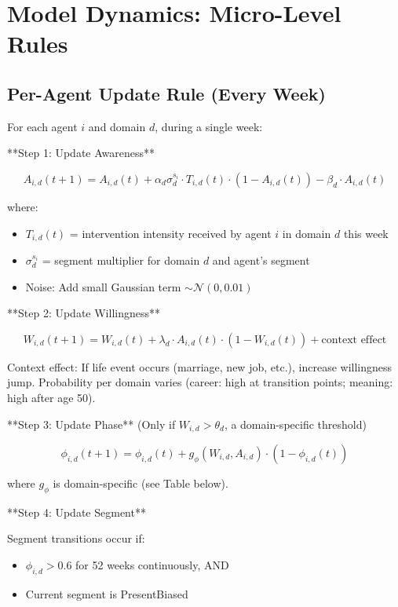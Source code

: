 \section{Model Dynamics: Micro-Level Rules}
\label{ppp:dynamics}

\subsection{Per-Agent Update Rule (Every Week)}

For each agent $i$ and domain $d$, during a single week:

**Step 1: Update Awareness**

\begin{equation}
A_{i,d}(t+1) = A_{i,d}(t) + \alpha_d \sigma_d^{s_i} \cdot T_{i,d}(t) \cdot (1 - A_{i,d}(t)) - \beta_d \cdot A_{i,d}(t)
\end{equation}

where:
\begin{itemize}[nosep]
\item $T_{i,d}(t)$ = intervention intensity received by agent $i$ in domain $d$ this week
\item $\sigma_d^{s_i}$ = segment multiplier for domain $d$ and agent's segment
\item Noise: Add small Gaussian term $\sim \mathcal{N}(0, 0.01)$
\end{itemize}

**Step 2: Update Willingness**

\begin{equation}
W_{i,d}(t+1) = W_{i,d}(t) + \lambda_d \cdot A_{i,d}(t) \cdot (1 - W_{i,d}(t)) + \text{context effect}
\end{equation}

Context effect: If life event occurs (marriage, new job, etc.), increase willingness jump. Probability per domain varies (career: high at transition points; meaning: high after age 50).

**Step 3: Update Phase** (Only if $W_{i,d} > \theta_d$, a domain-specific threshold)

\begin{equation}
\phi_{i,d}(t+1) = \phi_{i,d}(t) + g_\phi(W_{i,d}, A_{i,d}) \cdot (1 - \phi_{i,d}(t))
\end{equation}

where $g_\phi$ is domain-specific (see Table below).

**Step 4: Update Segment**

Segment transitions occur if:
\begin{itemize}[nosep]
\item $\phi_{i,d} > 0.6$ for 52 weeks continuously, AND
\item Current segment is PresentBiased
\end{itemize}

